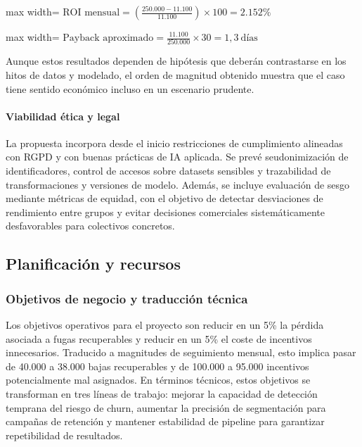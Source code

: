 \documentclass[12pt,a4paper]{article}
\begin{document}
\begin{adjustbox}{max width=\textwidth}
$\displaystyle \text{ROI mensual} = \left(\frac{250.000 - 11.100}{11.100}\right)\times 100 = 2.152\%$
\end{adjustbox}

\begin{adjustbox}{max width=\textwidth}
$\displaystyle \text{Payback aproximado} = \frac{11.100}{250.000}\times 30 = 1{,}3\ \text{días}$
\end{adjustbox}

Aunque estos resultados dependen de hipótesis que deberán contrastarse en los hitos de datos y modelado, el orden de magnitud obtenido muestra que el caso tiene sentido económico incluso en un escenario prudente.\par

\paragraph{Viabilidad ética y legal}

La propuesta incorpora desde el inicio restricciones de cumplimiento alineadas con RGPD y con buenas prácticas de IA aplicada. Se prevé seudonimización de identificadores, control de accesos sobre datasets sensibles y trazabilidad de transformaciones y versiones de modelo. Además, se incluye evaluación de sesgo mediante métricas de equidad, con el objetivo de detectar desviaciones de rendimiento entre grupos y evitar decisiones comerciales sistemáticamente desfavorables para colectivos concretos.\par

\subsection{Planificación y recursos}

\subsubsection{Objetivos de negocio y traducción técnica}

Los objetivos operativos para el proyecto son reducir en un 5\% la pérdida asociada a fugas recuperables y reducir en un 5\% el coste de incentivos innecesarios. Traducido a magnitudes de seguimiento mensual, esto implica pasar de 40.000 a 38.000 bajas recuperables y de 100.000 a 95.000 incentivos potencialmente mal asignados. En términos técnicos, estos objetivos se transforman en tres líneas de trabajo: mejorar la capacidad de detección temprana del riesgo de churn, aumentar la precisión de segmentación para campañas de retención y mantener estabilidad de pipeline para garantizar repetibilidad de resultados.\par
\end{document}
